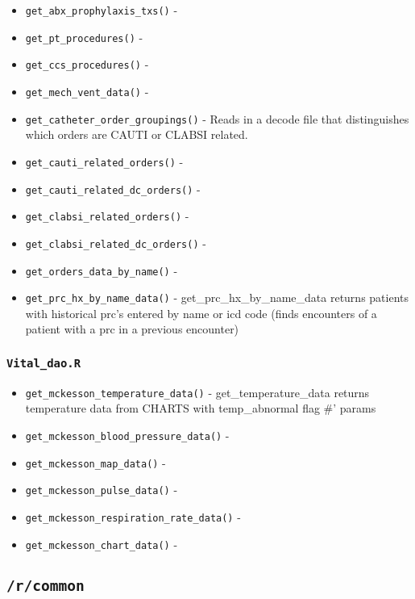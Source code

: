 \documentclass[
]{book}
\providecommand{\tightlist}{%
  \setlength{\itemsep}{0pt}\setlength{\parskip}{0pt}}
\begin{document}
\begin{itemize}
\tightlist
\item
  \texttt{get\_abx\_prophylaxis\_txs()} -
\item
  \texttt{get\_pt\_procedures()} -
\item
  \texttt{get\_ccs\_procedures()} -
\item
  \texttt{get\_mech\_vent\_data()} -
\item
  \texttt{get\_catheter\_order\_groupings()} - Reads in a decode file that distinguishes which orders are CAUTI or CLABSI related.
\item
  \texttt{get\_cauti\_related\_orders()} -
\item
  \texttt{get\_cauti\_related\_dc\_orders()} -
\item
  \texttt{get\_clabsi\_related\_orders()} -
\item
  \texttt{get\_clabsi\_related\_dc\_orders()} -
\item
  \texttt{get\_orders\_data\_by\_name()} -
\item
  \texttt{get\_prc\_hx\_by\_name\_data()} - get\_prc\_hx\_by\_name\_data returns patients with historical prc's entered by name or icd code (finds encounters of a patient with a prc in a previous encounter)
\end{itemize}

\hypertarget{vital_dao.r}{%
\subsubsection{\texorpdfstring{\texttt{Vital\_dao.R}}{Vital\_dao.R}}\label{vital_dao.r}}

\begin{itemize}
\tightlist
\item
  \texttt{get\_mckesson\_temperature\_data()} - get\_temperature\_data returns temperature data from CHARTS with temp\_abnormal flag \#' \citet{param} params
\item
  \texttt{get\_mckesson\_blood\_pressure\_data()} -
\item
  \texttt{get\_mckesson\_map\_data()} -
\item
  \texttt{get\_mckesson\_pulse\_data()} -
\item
  \texttt{get\_mckesson\_respiration\_rate\_data()} -
\item
  \texttt{get\_mckesson\_chart\_data()} -
\end{itemize}

\hypertarget{rcommon}{%
\subsection{\texorpdfstring{\texttt{/r/common}}{/r/common}}\label{rcommon}}
\end{document}
